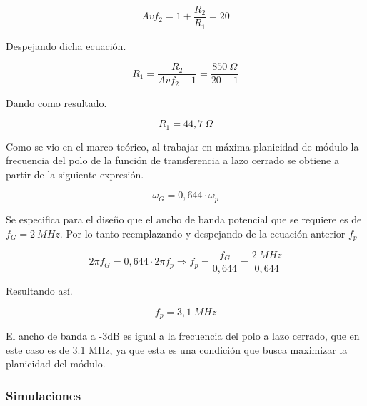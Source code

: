 \documentclass[12pt,A4paper,titlepage]{article}
\begin{document}
\begin{equation}
    Avf_2 = 1 + \frac{R_2}{R_1} = 20
\end{equation}

\bigskip
\hspace{1mm} Despejando dicha ecuación.

\begin{equation}
    R_1 = \frac{R_2}{Avf_2 - 1} = \frac{850~\Omega}{20 - 1}
\end{equation}

\bigskip
\hspace{1mm} Dando como resultado.

\begin{equation}
    \boxed{
    R_1 = 44,7~\Omega
    }
\end{equation}

\bigskip
\hspace{1mm} Como se vio en el marco teórico, al trabajar en máxima planicidad de módulo la frecuencia del polo de la función de transferencia a lazo cerrado se obtiene a partir de la siguiente expresión.

\begin{equation}
    \omega _G = 0,644 \cdot \omega _p 
\end{equation}

\bigskip
\hspace{1mm} Se especifica para el diseño que el ancho de banda potencial que se requiere es de \( f_G = 2~MHz \). Por lo tanto reemplazando y despejando de la ecuación anterior \( f_p \)

\begin{equation}
    2\pi f_G = 0,644 \cdot 2\pi f_p \Longrightarrow f_p = \frac{f_G}{0,644} = \frac{2~MHz}{0,644}
\end{equation}

\bigskip
\hspace{1mm} Resultando así.

\begin{equation}
    \boxed{
    f_p = 3,1~MHz
    }
\end{equation}

\bigskip
\hspace{1mm} El ancho de banda a -3dB es igual a la frecuencia del polo a lazo cerrado, que en este caso es de 3.1 MHz, ya que esta es una condición que busca maximizar la planicidad del módulo.

\subsubsection{Simulaciones}
\end{document}
